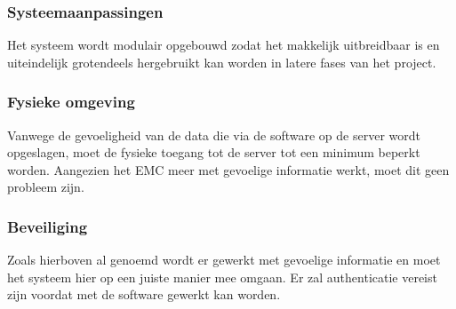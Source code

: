 \subsubsection{Systeemaanpassingen}
Het systeem wordt modulair opgebouwd zodat het makkelijk uitbreidbaar is en uiteindelijk grotendeels hergebruikt kan worden in latere fases van het project.

\subsubsection{Fysieke omgeving}
Vanwege de gevoeligheid van de data die via de software op de server wordt opgeslagen, moet de fysieke toegang tot de server tot een minimum beperkt worden. Aangezien het EMC meer met gevoelige informatie werkt, moet dit geen probleem zijn.

\subsubsection{Beveiliging}
Zoals hierboven al genoemd wordt er gewerkt met gevoelige informatie en moet het systeem hier op een juiste manier mee omgaan. 
Er zal authenticatie vereist zijn voordat met de software gewerkt kan worden.
